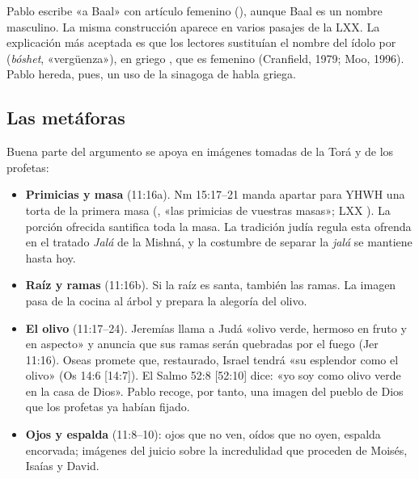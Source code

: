 \begin{nota}
Pablo escribe «a Baal» con artículo femenino (), aunque Baal es un nombre masculino. La misma construcción aparece en varios pasajes de la LXX. La explicación más aceptada es que los lectores sustituían el nombre del ídolo por  (\emph{bóshet}, «vergüenza»), en griego , que es femenino (Cranfield, 1979; Moo, 1996). Pablo hereda, pues, un uso de la sinagoga de habla griega.
\end{nota}

\subsection{Las metáforas}
Buena parte del argumento se apoya en imágenes tomadas de la Torá y de los profetas:
\begin{itemize}
\item \textbf{Primicias y masa} (11:16a). Nm 15:17--21 manda apartar para YHWH una torta de la primera masa (, «las primicias de vuestras masas»; LXX ). La porción ofrecida santifica toda la masa. La tradición judía regula esta ofrenda en el tratado \emph{Jalá} de la Mishná, y la costumbre de separar la \emph{jalá} se mantiene hasta hoy.
\item \textbf{Raíz y ramas} (11:16b). Si la raíz es santa, también las ramas. La imagen pasa de la cocina al árbol y prepara la alegoría del olivo.
\item \textbf{El olivo} (11:17--24). Jeremías llama a Judá «olivo verde, hermoso en fruto y en aspecto» y anuncia que sus ramas serán quebradas por el fuego (Jer 11:16). Oseas promete que, restaurado, Israel tendrá «su esplendor como el olivo» (Os 14:6 [14:7]). El Salmo 52:8 [52:10] dice: «yo soy como olivo verde en la casa de Dios». Pablo recoge, por tanto, una imagen del pueblo de Dios que los profetas ya habían fijado.
\item \textbf{Ojos y espalda} (11:8--10): ojos que no ven, oídos que no oyen, espalda encorvada; imágenes del juicio sobre la incredulidad que proceden de Moisés, Isaías y David.
\end{itemize}

